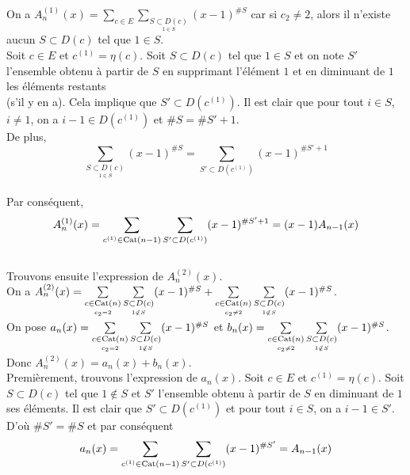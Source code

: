 On a $A_{n}^{(1)}(x) = \sum\limits_{c \in E}\sum\limits_{\underset{1\in S}{S\subset D(c)}}(x-1)^{{\#S}}$ car si $c_{2}\neq 2$, alors il n'existe aucun $S\subset D(c)$ tel que $1\in S$. \\
Soit $c\in E$ et $c^{(1)}=\eta(c)$. Soit $S\subset D(c)$ tel que $1\in S$ et on note $S'$ l'ensemble obtenu à partir de $S$ en supprimant l'élément $1$ et en diminuant de $1$ les éléments restants \\(s'il y en a). Cela implique que $S'\subset D(c^{(1)})$.
Il est clair que pour tout $i \in S$, $i \neq 1$, on a $i-1 \in  D(c^{(1)})$ et $\#S = \#S' + 1$.\\
De plus, $$\sum \limits_{\underset{1\in S}{S\subset D(c)}}(x-1)^{\#S} = \sum \limits_{S'\subset D(c^{(1)})}(x-1)^{\#S' + 1}$$\\
Par conséquent, $$A_{n}^{(1)}(x)=\sum\limits_{c^{(1)}\in \begin{rm}Cat\end{rm}(n-1)}\sum \limits_{S'\subset D(c^{(1)})}(x-1)^{\#S' + 1}=(x-1)A_{n-1}(x)$$\vspace{15pt}\\
Trouvons ensuite l'expression de $A_{n}^{(2)}(x)$.\\
On a $A_{n}^{(2)}(x) = \sum\limits_{\underset{c_{2}=2}{c\in \begin{rm}Cat\end{rm}(n)}} \sum\limits_{\underset{1\notin S}{S\subset D(c)}}(x-1)^{\#S} + \sum\limits_{\underset{c_{2}\neq 2}{c\in \begin{rm}Cat\end{rm}(n)}} \sum\limits_{\underset{1\notin S}{S\subset D(c)}}(x-1)^{\#S}$.\\
On pose $a_{n}(x)=\sum\limits_{\underset{c_{2}=2}{c\in \begin{rm}Cat\end{rm}(n)}} \sum\limits_{\underset{1\notin S}{S\subset D(c)}}(x-1)^{\#S}$ et $b_{n}(x) = \sum\limits_{\underset{c_{2}\neq 2}{c\in \begin{rm}Cat\end{rm}(n)}} \sum\limits_{\underset{1\notin S}{S\subset D(c)}}(x-1)^{\#S}$.\\
Donc $A_{n}^{(2)}(x)=a_{n}(x)+b_{n}(x)$.\\
Premièrement, trouvons l'expression de $a_{n}(x)$. Soit $c \in E$ et $c^{(1)} = \eta(c)$. Soit $S\subset D(c)$ tel que $1\notin S$ et $S'$ l'ensemble obtenu à partir de $S$ en diminuant de $1$ ses éléments. Il est clair que $S'\subset D(c^{(1)})$ et pour tout $i\in S$, on a $i-1\in S'$. D'où $\#S' = \#S$ et par conséquent $$a_{n}(x) = \sum\limits_{c^{(1)}\in \begin{rm}Cat\end{rm}(n-1)} \sum\limits_{S'\subset D(c^{(1)})}(x-1)^{\#S'}=A_{n-1}(x)$$
